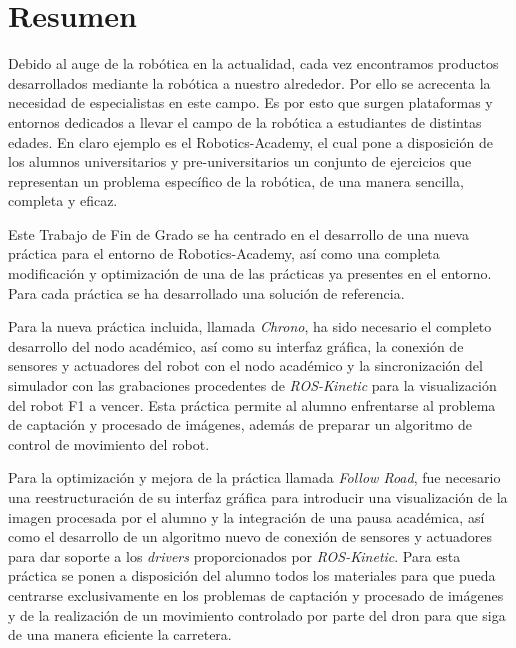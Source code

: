 \chapter*{Resumen}
\setlength{\parskip}{1ex}

Debido al auge de la robótica en la actualidad, cada vez encontramos productos desarrollados mediante la robótica a nuestro alrededor. Por ello se acrecenta la necesidad de especialistas en este campo. Es por esto que surgen plataformas y entornos dedicados a llevar el campo de la robótica a estudiantes de distintas edades. En claro ejemplo es el Robotics-Academy, el cual pone a disposición de los alumnos universitarios y pre-universitarios un conjunto de ejercicios que representan un problema específico de la robótica, de una manera sencilla, completa y eficaz.

Este Trabajo de Fin de Grado se ha centrado en el desarrollo de una nueva práctica para el entorno de Robotics-Academy, así como una completa modificación y optimización de una de las prácticas ya presentes en el entorno. Para cada práctica se ha desarrollado una solución de referencia.

Para la nueva práctica incluida, llamada \textit{Chrono}, ha sido necesario el completo desarrollo del nodo académico, así como su interfaz gráfica, la conexión de sensores y actuadores del robot con el nodo académico y la sincronización del simulador con las grabaciones procedentes de \textit{ROS-Kinetic} para la visualización del robot F1 a vencer.
Esta práctica permite al alumno enfrentarse al problema de captación y procesado de imágenes, además de preparar un algoritmo de control de movimiento del robot.

Para la optimización y mejora de la práctica llamada \textit{Follow Road}, fue necesario una reestructuración de su interfaz gráfica para introducir una visualización de la imagen procesada por el alumno y la integración de una pausa académica, así como el desarrollo de un algoritmo nuevo de conexión de sensores y actuadores para dar soporte a los \textit{drivers} proporcionados por \textit{ROS-Kinetic}.
Para esta práctica se ponen a disposición del alumno todos los materiales para que pueda centrarse exclusivamente en los problemas de captación y procesado de imágenes y de la realización de un movimiento controlado por parte del dron para que siga de una manera eficiente la carretera.